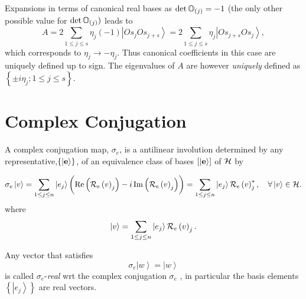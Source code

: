 Expansions in terms of canonical real bases as $\det {\Bbb O}_{\left(
j\right) }=-1$ (the only other possible value for $\det {\Bbb O}_{\left(
j\right) })$ leads to%
\begin{equation}
A=2\sum_{1\leq j\leq s}\eta _{j}\left( -1\right) \left\vert
Os_{j}Os_{j+s}\right\rangle =2\sum_{1\leq j\leq s}\eta _{j}\left\vert
Os_{j+s}Os_{j}\right\rangle ,
\end{equation}%
which corresponds to $\eta _{j}\rightarrow -\eta _{j}$. Thus canonical
coefficients in this case are uniquely defined up to sign. The eigenvalues
of $A$ are however {\em uniquely} defined as $\left\{ \pm i\eta _{j};1\leq
j\leq s\right\} $.

\section{Complex Conjugation\label{star}}

A complex conjugation map, $\sigma _{e}$, is a antilinear involution
determined by any representative,$\left\{ \left\vert {\bf e}\right\rangle
\right\} $, of an equivalence class of bases $\left[ \left\vert {\bf e}%
\right\rangle \right] $ of ${\cal H}$ by

\begin{definition}
\begin{equation}
\sigma _{e}\left\vert v\right\rangle =%
\mathop{\displaystyle\sum}%
_{1\leq j\leq n}\left\vert e_{j}\right\rangle \left( \stackrel{}{%
\mathop{\rm Re}%
\left( {\cal R}_{e}\left( v\right) _{j}\right) -i%
\mathop{\rm Im}%
\left( {\cal R}_{e}\left( v\right) _{j}\right) }\right) =%
\mathop{\displaystyle\sum}%
_{1\leq j\leq n}\left\vert e_{j}\right\rangle {\cal R}_{e}\left( v\right)
_{j}^{\ast },\quad \forall \left\vert v\right\rangle \in {\cal H}.
\end{equation}%
where 
\begin{equation}
\left\vert v\right\rangle =%
\mathop{\displaystyle\sum}%
_{1\leq j\leq n}\left\vert e_{j}\right\rangle {\cal R}_{e}\left( v\right)
_{j}.
\end{equation}
\end{definition}

\begin{definition}
Any vector that satisfies 
\begin{equation}
\sigma _{e}\left\vert w\right\rangle =\left\vert w\right\rangle
\end{equation}%
is called $\sigma _{e}$-{\em real} wrt the complex conjugation $\sigma _{e}$%
, in particular the basis elements $\left\{ \left\vert e_{j}\right\rangle
\right\} $ are real vectors.
\end{definition}

